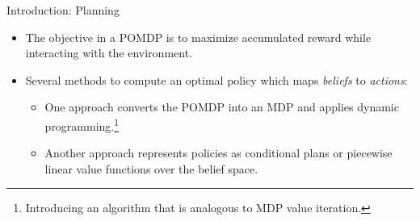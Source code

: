 \begin{frame}[fragile]{Introduction: Planning}

\begin{itemize}
    \item The objective in a POMDP is to maximize accumulated reward while interacting with the environment.
    \item Several methods to compute an optimal policy which maps \textit{beliefs} to \textit{actions}:
    \begin{itemize}
         \item One approach converts the POMDP into an MDP and applies dynamic programming.\footnote{Introducing an algorithm that is analogous to MDP value iteration.}
         \item Another approach represents policies as conditional plans or piecewise linear value functions over the belief space.
     \end{itemize} 
\end{itemize}

\end{frame}
